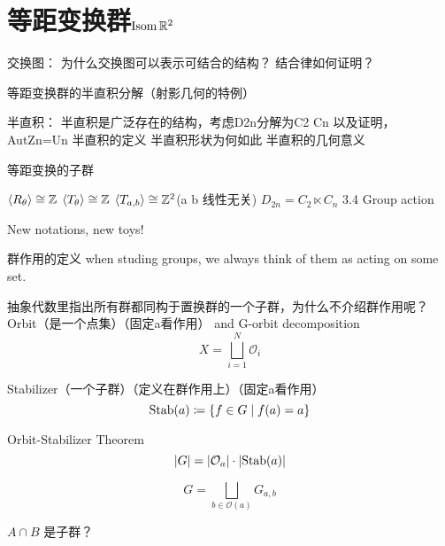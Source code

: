 \chapter{等距变换群\(\operatorname{\mathrm{Isom}} \mathbb{R}^{2}\)}

交换图： 为什么交换图可以表示可结合的结构？
结合律如何证明？

等距变换群的半直积分解（射影几何的特例）

半直积：
半直积是广泛存在的结构，考虑D2n分解为C2 Cn 以及证明，AutZn=Un
半直积的定义
半直积形状为何如此
半直积的几何意义

等距变换的子群

\(\langle R_{\theta} \rangle\cong \mathbb{Z}\)
\(\langle T_{\theta} \rangle\cong \mathbb{Z}\)
\(\langle T_{a,b} \rangle\cong \mathbb{Z}^{2}\)(a b 线性无关)
\(D_{2n}=C_{2}\ltimes C_{n}\)
3.4 Group action

New notations, new toys!

群作用的定义
when studing groups, we always think of them as acting on some set.

抽象代数里指出所有群都同构于置换群的一个子群，为什么不介绍群作用呢？
Orbit（是一个点集）（固定a看作用） and G-orbit decomposition
\[
    X=\bigsqcup_{i=1}^{N} \mathcal{O}_{i}
\]

Stabilizer（一个子群）（定义在群作用上）（固定a看作用）
\[
    \operatorname{\mathrm{Stab}}(a)\coloneq \left\{ f \in G \mid f(a)=a \right\}
\]

Orbit-Stabilizer Theorem
\[
    \left| G \right| = \left| \mathcal{O}_{a} \right| \cdot
    \left| \operatorname{\mathrm{Stab}}(a) \right|
\]

\[
    G= \bigsqcup_{b\in \mathcal{O}(a)} G_{a,b}
\]

\(A\cap B\) 是子群？
